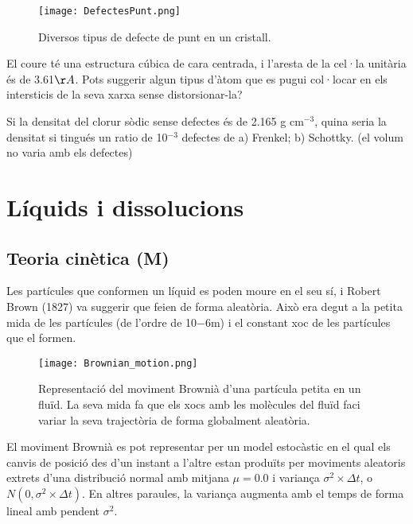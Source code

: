 \begin{figure}[h]
\centering
\texttt{[image: DefectesPunt.png]}
\caption{Diversos tipus de defecte de punt en un cristall.}
\label{fig:DefectesPunt}
\end{figure}

\begin{exr}
El coure té una estructura cúbica de cara centrada, i l'aresta de la cel·la unitària és de 3.61${\AA}$. Pots suggerir algun tipus d'àtom que es pugui col·locar en els  intersticis de la seva xarxa sense distorsionar-la?
\end{exr}

\begin{exr}
Si la densitat del clorur sòdic sense defectes és de 2.165 g cm$^{-3}$, quina seria la densitat si tingués un ratio de 10$^{-3}$ defectes de a) Frenkel; b) Schottky. (el volum no varia amb els defectes)
\end{exr}


\section{Líquids i dissolucions}

\subsection{Teoria cinètica (M)}

Les partícules que conformen un líquid es poden moure en el seu sí, i Robert Brown (1827) va suggerir que feien de forma aleatòria. Això era degut a la petita mida de les partícules (de l'ordre de 10${-6}$m) i el constant xoc de les partícules que el formen.

\begin{figure}[h]
\centering
\texttt{[image: Brownian\_motion.png]}
\caption[Moviment Brownià]{Representació del moviment Brownià d'una partícula petita en un fluïd. La seva mida fa que els xocs amb les molècules del fluïd faci variar la seva trajectòria de forma globalment aleatòria.}
\label{fig:Brownian_motion}
\end{figure}

El moviment Brownià es pot representar per un model estocàstic en el qual els canvis de posició des d'un instant a l'altre estan produïts per moviments aleatoris extrets d'una distribució normal amb mitjana $\mu=0.0$ i variança $\sigma^2 \times \Delta t$, o $N(0,\sigma^2 \times \Delta t)$. En altres paraules, la variança augmenta amb el temps de forma lineal amb pendent $\sigma^2$. 

